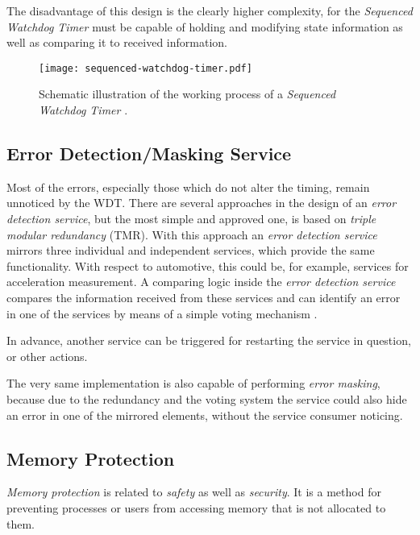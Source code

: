 \begin{description}
The disadvantage of this design is the clearly higher complexity, for the \emph{Sequenced Watchdog Timer} must be capable of holding and modifying state information as well as comparing it to received information.

\begin{figure}[!htbp]
\centering
\texttt{[image: sequenced-watchdog-timer.pdf]}
\caption{Schematic illustration of the working process of a \emph{Sequenced Watchdog Timer} \cite{elattar2007}.}
\label{fig:sequenced-watchdog-timer}
\end{figure}

\end{description}






\subsection{Error Detection/Masking Service}
\label{sec:error-detection-service}

Most of the errors, especially those which do not alter the timing, remain unnoticed by the WDT. There are several approaches in the design of an \emph{error detection service}, but the most simple and approved one, is based on \emph{triple modular redundancy} (TMR). With this approach an \emph{error detection service} mirrors three individual and independent services, which provide the same functionality. With respect to automotive, this could be, for example, services for acceleration measurement. A comparing logic inside the \emph{error detection service} compares the information received from these services and can identify an error in one of the services by means of a simple voting mechanism \cite{wiki_tmr}.

In advance, another service can be triggered for restarting the service in question, or other actions.

The very same implementation is also capable of performing \emph{error masking}, because due to the redundancy and the voting system the service could also hide an error in one of the mirrored elements, without the service consumer noticing.


\subsection{Memory Protection}
\emph{Memory protection} is related to \emph{safety} as well as \emph{security}. It is a method for preventing processes or users from accessing memory that is not allocated to them.

